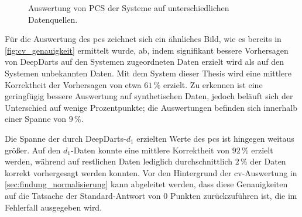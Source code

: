 \begin{figure}
    \centering
    \caption{Auswertung von PCS der Systeme auf unterschiedlichen Datenquellen.}
    \label{fig:nn_pcs}
\end{figure}

Für die Auswertung des \ac{pcs} zeichnet sich ein ähnliches Bild, wie es bereits in \autoref{fig:cv_genauigkeit} ermittelt wurde, ab, indem signifikant bessere Vorhersagen von DeepDarts auf den Systemen zugeordneten Daten erzielt wird als auf den Systemen unbekannten Daten. Mit dem System dieser Thesis wird eine mittlere Korrektheit der Vorhersagen von etwa $61\,\%$ erzielt. Zu erkennen ist eine geringfügig bessere Auswertung auf synthetischen Daten, jedoch beläuft sich der Unterschied auf wenige Prozentpunkte; die Auswertungen befinden sich innerhalb einer Spanne von $9\,\%$.

Die Spanne der durch DeepDarts-$d_1$ erzielten Werte des \ac{pcs} ist hingegen weitaus größer. Auf den $d_1$-Daten konnte eine mittlere Korrektheit von $92\,\%$ erzielt werden, während auf restlichen Daten lediglich durchschnittlich $2\,\%$ der Daten korrekt vorhergesagt werden konnten. Vor den Hintergrund der \ac{cv}-Auswertung in \autoref{sec:findung_normalisierung} kann abgeleitet werden, dass diese Genauigkeiten auf die Tatsache der Standard-Antwort von 0 Punkten zurückzuführen ist, die im Fehlerfall ausgegeben wird.

